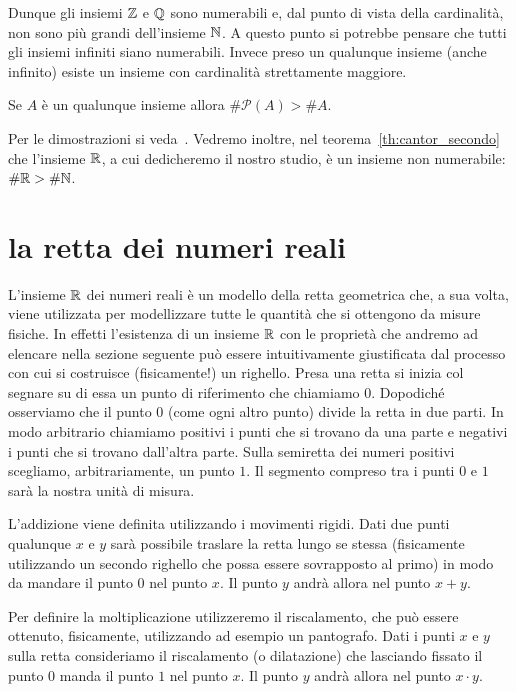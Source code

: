 Dunque gli insiemi $\mathbb Z$ e $\mathbb Q$ sono numerabili e, dal punto di vista della cardinalità,
non sono più grandi dell'insieme $\mathbb N$.
A questo punto si potrebbe pensare che
tutti gli insiemi infiniti siano numerabili.
Invece preso un qualunque insieme (anche infinito)
esiste un insieme con cardinalità strettamente maggiore.
%
\begin{theorem}[Cantor]
  Se $A$ è un qualunque insieme allora $\# \mathcal P(A)> \# A$.
\end{theorem}
Per le dimostrazioni si veda~\cite{appunti_logica}.
%
Vedremo inoltre, nel teorema~\ref{th:cantor_secondo}
che l'insieme $\mathbb R$, a cui dedicheremo il nostro studio,
è un insieme non numerabile: $\#\mathbb R > \#\mathbb N$.

\section{la retta dei numeri reali}
\label{sec:reali}

L'insieme $\mathbb R$ dei numeri reali è un modello della retta geometrica che,
a sua volta, viene utilizzata per modellizzare tutte le quantità che si ottengono
da misure fisiche.
In effetti l'esistenza di un insieme $\mathbb R$ con le proprietà
che andremo ad elencare nella sezione seguente
può essere intuitivamente giustificata dal processo con cui
si costruisce (fisicamente!) un righello. Presa una retta si inizia col segnare
su di essa un punto di riferimento che chiamiamo $0$. Dopodiché osserviamo che
il punto $0$ (come ogni altro punto) divide la retta in due parti. In modo arbitrario
chiamiamo positivi i punti che si trovano da una parte e negativi i punti che
si trovano dall'altra parte. Sulla semiretta dei numeri positivi scegliamo, arbitrariamente,
un punto $1$. Il segmento compreso tra i punti $0$ e $1$ sarà la nostra unità di
misura.

L'addizione viene definita utilizzando i movimenti rigidi.
Dati due punti qualunque $x$ e $y$ sarà possibile
traslare la retta lungo se stessa
(fisicamente utilizzando un secondo righello che possa essere sovrapposto al primo)
in modo da mandare il punto $0$ nel punto $x$. Il punto $y$ andrà allora nel
punto $x+y$.

Per definire la moltiplicazione utilizzeremo il riscalamento, che può
essere ottenuto, fisicamente, utilizzando ad esempio un pantografo.
Dati i punti $x$ e $y$ sulla retta consideriamo il riscalamento (o dilatazione)
che lasciando fissato il punto $0$ manda il punto $1$ nel punto $x$. Il punto $y$
andrà allora nel punto $x\cdot y$.

